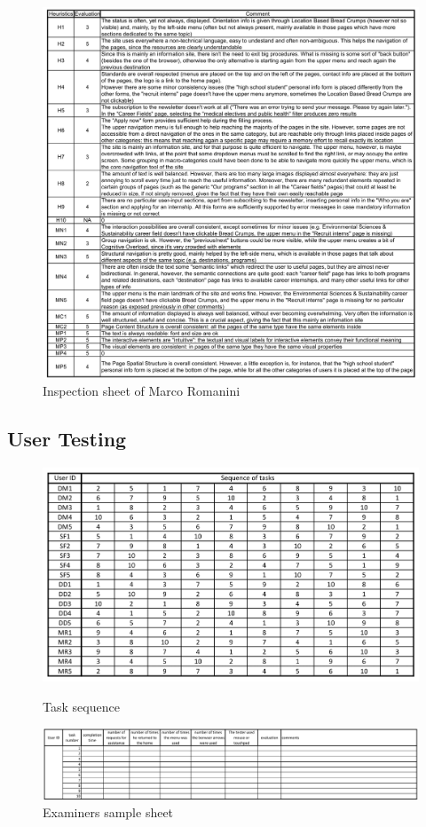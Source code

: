 \documentclass[11pt, letterpaper]{article}
\begin{document}
    \begin{figure}[H]
        \centering
        \includegraphics[width=18cm]{images/annex/MR_inspection.png}
        \caption{Inspection sheet of Marco Romanini}
    \end{figure}

\subsection{User Testing}
    \begin{figure}[H]
        \centering
        \includegraphics[width=18cm]{images/annex/Task_sequence.png}
        \label{annex:task_sequence}
        \caption{Task sequence}
    \end{figure}
    \begin{figure}[H]
        \centering
        \includegraphics[width=18cm]{images/user testing/Sample_sheet.png}
        \caption{Examiners sample sheet}
    \end{figure}
\end{document}
